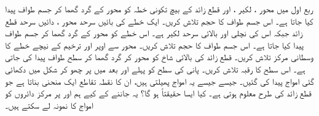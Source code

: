 ربع اول میں محور ، لکیر ،  اور قطع زائد  کے بیچ تکونی خطہ کو محور  کے گرد گھما کر جسم طواف پیدا کیا جاتا ہے۔  اس جسم  طواف کا حجم تلاش کریں۔
ایک خطے  کی بائیں سرحد محور ، دائیں سرحد قطع زائد   جبکہ اس کی  نچلی اور بالائی سرحد لکیر  ہے۔ اس خطے کو محور  کے گرد گھما کر جسم طواف پیدا کیا جاتا ہے۔ اس جسم طواف  کا حجم تلاش کریں۔ 
محور  سے  اوپر  اور ترخیم  کے نیچے  خطے کا وسطانی مرکز تلاش کریں۔
قطع زائد  کی  بالائی شاخ  کو محور  کر گرد گھما کر سطح طواف پیدا کی جاتی ہے۔ اس سطح کا رقبہ تلاش کریں۔
پانی کی سطح کو پہلے  اور بعد میں  پر چھو کر شکل  میں دکھائی گئی امواج پیدا کی گئیں۔ جیسے جیسے یہ امواج پھیلتی ہیں، ان کا نقطہ تقاطع ایک منحنی بناتا ہے جو قطع زائد کی طرح معلوم ہوتی  ہے۔ کیا ایسا حقیقتاً ہو گا؟  یہ جاننے کے کیے ہم  اور  پر مرکز دائروں کو امواج کا نمونہ لے سکتے ہیں۔

